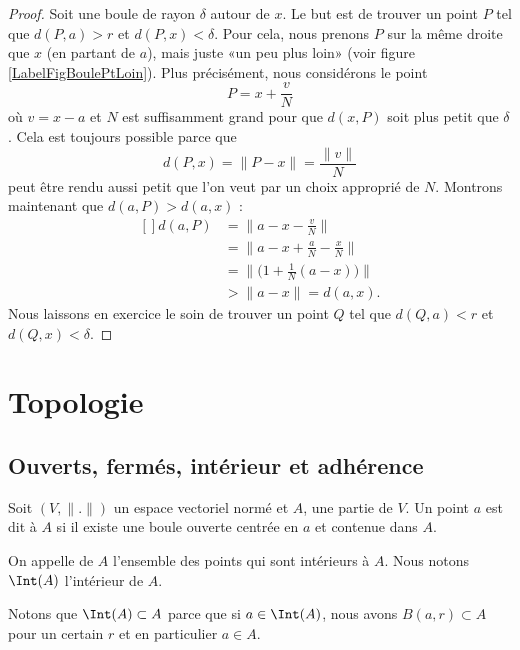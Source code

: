 \begin{proof}
	Soit une boule de rayon $\delta$ autour de $x$. Le but est de trouver un point $P$ tel que $d(P,a)>r$ et $d(P,x)<\delta$. Pour cela, nous prenons $P$ sur la même droite que $x$ (en partant de $a$), mais juste «un peu plus loin» (voir figure \ref{LabelFigBoulePtLoin}). Plus précisément, nous considérons le point
	\begin{equation}
		P=x+\frac{ v }{ N }
	\end{equation}
	où $v=x-a$ et $N$ est suffisamment grand pour que $d(x,P)$ soit plus petit que $\delta$. Cela est toujours possible parce que
	\begin{equation}
		d(P,x)=\| P-x \|=\frac{ \| v \| }{ N }
	\end{equation}
	peut être rendu aussi petit que l'on veut par un choix approprié de $N$. Montrons maintenant que $d(a,P)>d(a,x)$ :
	\begin{equation}
		\begin{aligned}[]
			d(a,P)&=\| a-x-\frac{ v }{ N }\| \\
			&=\| a-x+\frac{ a }{ N }-\frac{ x }{ N } \|\\
			&=\| \big( 1+\frac{1}{ N }(a-x) \big) \|\\
			&>\| a-x \|=d(a,x).
		\end{aligned}
	\end{equation}
	Nous laissons en exercice le soin de trouver un point $Q$ tel que $d(Q,a)<r$ et $d(Q,x)<\delta$.
\end{proof}

\section{Topologie}\label{Sect_topologie}

\subsection{Ouverts, fermés, intérieur et adhérence}

\begin{definition}
	Soit $(V,\| . \|)$ un espace vectoriel normé et $A$, une partie de $V$. Un point $a$ est dit  à $A$ si il existe une boule ouverte centrée en $a$ et contenue dans $A$.

	On appelle  de $A$ l'ensemble des points qui sont intérieurs à $A$. Nous notons $\Int(A)$ l'intérieur de $A$.
\end{definition}
Notons que $\Int(A)\subset A$ parce que si $a\in\Int(A)$, nous avons $B(a,r)\subset A$ pour un certain $r$ et en particulier $a\in A$.

